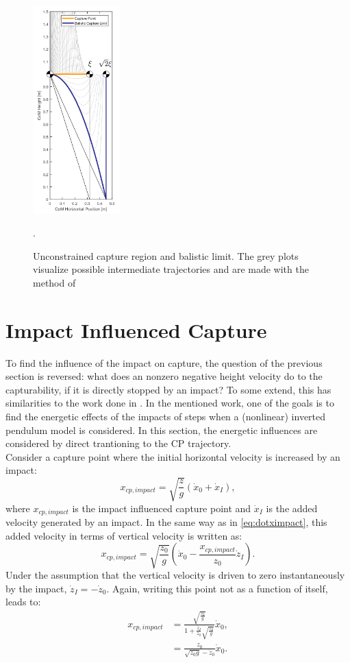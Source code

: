 \begin{figure}[h]
\centering
\includegraphics[width=0.3\textwidth]{STYLESTUFF/CPvsBalistic.png}
\caption{Unconstrained capture region and balistic limit. The grey plots visualize possible intermediate trajectories and are made with the method of \cite{koolen2016balance}}.
\label{fig:cpbal}
\end{figure}
\newpage
\section{Impact Influenced Capture}
To find the influence of the impact on capture, the question of the previous section is reversed: what does an nonzero negative height velocity do to the capturability, if it is directly stopped by an impact? To some extend, this has similarities to the work done in \cite{kuo2005energetic}. In the mentioned work, one of the goals is to find the energetic effects of the impacts of steps when a (nonlinear) inverted pendulum model is considered. In this section, the energetic influences are considered by direct trantioning to the \ac{CP} trajectory.\\
Consider a capture point where the initial horizontal velocity is increased by an impact:
\begin{equation}
x_{cp,impact} = \sqrt{\frac{z}{g}}(\dot{x}_0+\dot{x}_I),
\end{equation}
where $x_{cp,impact}$ is the impact influenced capture point and $\dot{x}_I$ is the added velocity generated by an impact. In the same way as in \eqref{eq:dotximpact}, this added velocity in terms of vertical velocity is written as:
\begin{equation}
x_{cp,impact} = \sqrt{\frac{z_0}{g}}(\dot{x}_0-\frac{x_{cp,impact}}{z_0}\dot{z}_I). 
\end{equation}
Under the assumption that the vertical velocity is driven to zero instantaneously by the impact, $\dot{z}_I=-\dot{z}_0$. Again, writing this point not as a function of itself, leads to:
\begin{align}\label{eq:xcpimpact}
x_{cp,impact} &= \frac{\sqrt{\frac{z_0}{g}}}{1+\frac{\dot{z}_I}{z_0}\sqrt{\frac{z_0}{g}}}\dot{x}_0,\\
			&= \frac{z_0}{\sqrt{z_0g}-\dot{z}_0}\dot{x}_0.
\end{align}

